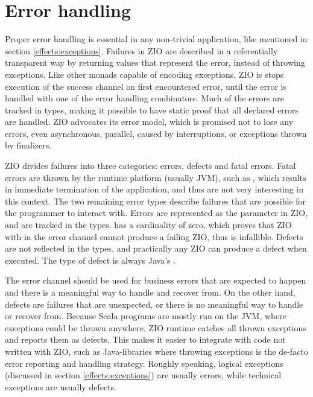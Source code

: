 



\section{Error handling} \label{zio:error-handling}
Proper error handling is essential in any non-trivial application, like mentioned in section \ref{effects:exceptions}. Failures in ZIO are described in a referentially transparent way by returning values that represent the error, instead of throwing exceptions. Like other monads capable of encoding exceptions, ZIO is stops execution of the success channel on first encountered error, until the error is handled with one of the error handling combinators. Much of the errors are tracked in types, making it possible to have static proof that all declared errors are handled. ZIO advocates its error model, which is promised not to lose any errors, even asynchronous, parallel, caused by interruptions, or exceptions thrown by finalizers.

ZIO divides failures into three categories: errors, defects and fatal errors. Fatal errors are thrown by the runtime platform (usually JVM), such as , which results in immediate termination of the application, and thus are not very interesting in this context. The two remaining error types describe failures that are possible for the programmer to interact with. Errors are represented as the  parameter in ZIO, and are tracked in the types.  has a cardinality of zero, which proves that ZIO with  in the error channel cannot produce a failing ZIO, thus is infallible. Defects are not reflected in the types, and practically any ZIO can produce a defect when executed. The type of defect is always Java's .

The error channel should be used for business errors that are expected to happen and there is a meaningful way to handle and recover from. On the other hand, defects are failures that are unexpected, or there is no meaningful way to handle or recover from. Because Scala programs are mostly run on the JVM, where exceptions could be thrown anywhere, ZIO runtime catches all thrown exceptions and reports them as defects. This makes it easier to integrate with code not written with ZIO, such as Java-libraries where throwing exceptions is the de-facto error reporting and handling strategy. Roughly speaking, logical exceptions (discussed in section \ref{effects:exceptions}) are usually errors, while technical exceptions are usually defects.

